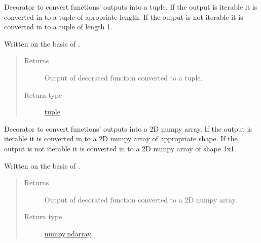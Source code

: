 \documentclass[a4paper,10pt,english]{sphinxmanual}
\begin{document}

\begin{fulllineitems}
\label{aqueduct.utils.helpers:aqueduct.utils.helpers.tupleify}
Decorator to convert functions' outputs into a tuple. If the output is iterable it is converted in to a tuple
of apropriate length. If the output is not iterable it is converted in to a tuple of length 1.

Written on the basis of {\hyperref[aqueduct.utils.helpers:aqueduct.utils.helpers.listify]{}}.
\begin{quote}\begin{description}
\item[{Returns}] \leavevmode
Output of decorated function converted to a tuple.

\item[{Return type}] \leavevmode
\href{http://docs.python.org/2/library/functions.html\#tuple}{tuple}

\end{description}\end{quote}

\end{fulllineitems}


\begin{fulllineitems}
\label{aqueduct.utils.helpers:aqueduct.utils.helpers.arrayify}
Decorator to convert functions' outputs into a 2D numpy array. If the output is iterable it is converted in to a 2D numpy array
of appropriate shape. If the output is not iterable it is converted in to a 2D numpy array of shape 1x1.

Written on the basis of {\hyperref[aqueduct.utils.helpers:aqueduct.utils.helpers.listify]{}}.
\begin{quote}\begin{description}
\item[{Returns}] \leavevmode
Output of decorated function converted to a 2D numpy array.

\item[{Return type}] \leavevmode
\href{http://docs.scipy.org/doc/numpy/reference/generated/numpy.ndarray.html\#numpy.ndarray}{numpy.ndarray}

\end{description}\end{quote}

\end{fulllineitems}
\end{document}
